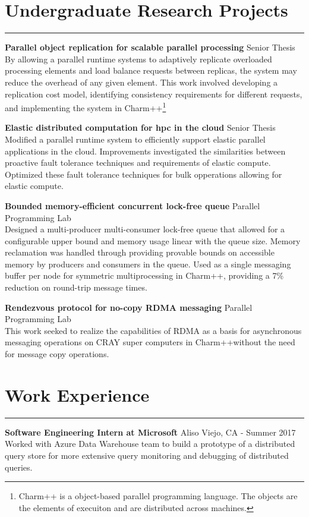 \documentclass[10pt]{article}
\newcommand{\leftrightrow}[2]{
	#1 \hfill #2 \\
}
\newcommand{\workblock}[3]{
	\leftrightrow{\textbf{#1}}{#2}
    #3 \\
}
\newcommand{\researchblock}[3]{
	\leftrightrow{\textbf{#1}}{#2}#3
}
\begin{document}
\section{Undergraduate Research Projects}
\hrule \vspace{0.4em}
\researchblock{Parallel object replication for scalable parallel processing}{Senior Thesis}
{
	By allowing a parallel runtime systems to adaptively replicate overloaded processing elements and load balance requests between replicas, the system may reduce the overhead of any given element. This work involved developing a replication cost model, identifying consistency requirements for different requests, and
	implementing the system in Charm++\footnote[1]{
	Charm++ is a object-based parallel programming language. The objects are the elements of execuiton and are distributed across machines.}
}

\vspace{0.6em}

\researchblock{Elastic distributed computation for hpc in the cloud}{Senior Thesis}
{
	Modified a parallel runtime system to efficiently support elastic parallel applications in the cloud. Improvements investigated the similarities between proactive fault tolerance techniques and requirements of elastic compute. Optimized these fault tolerance techniques for bulk opperations allowing for elastic compute.
}

\vspace{0.6em}

\researchblock{Bounded memory-efficient concurrent lock-free queue}{Parallel Programming Lab}
{
	Designed a multi-producer multi-consumer lock-free queue that allowed for a configurable upper bound and memory usage linear with the queue size. Memory reclamation was handled through providing provable bounds on accessible memory by producers and consumers in the queue. Used as a single messaging buffer per node for symmetric multiprocessing in Charm++\footnotemark[1], providing a 7\% reduction on round-trip message times.
}

\vspace{0.6em}

\researchblock{Rendezvous protocol for no-copy RDMA messaging}{Parallel Programming Lab}{
	This work seeked to realize the capabilities of RDMA as a basis for asynchronous messaging operations on CRAY super computers in Charm++\footnotemark[1] without the need for message copy operations. 
}

\section{Work Experience}
\hrule \vspace{0.4em}
\workblock{Software Engineering Intern at Microsoft}{Aliso Viejo, CA - Summer 2017}{Worked with Azure Data Warehouse team to build a prototype of a distributed query store for more extensive query monitoring and debugging of distributed queries.} 
\end{document}
